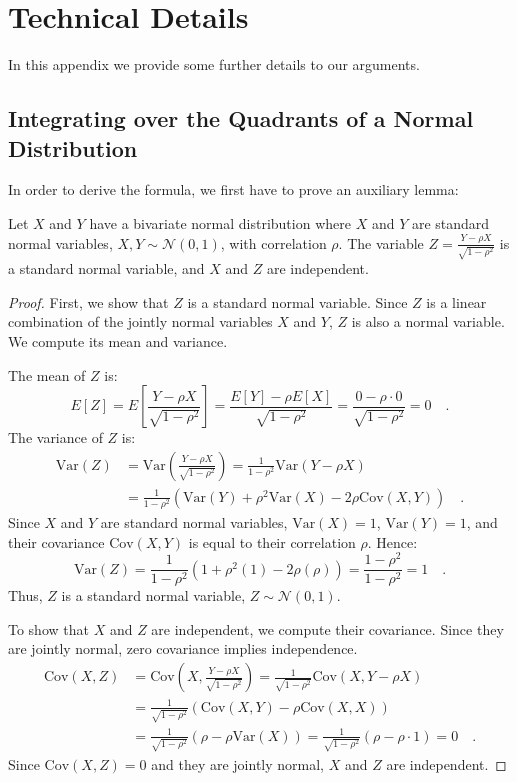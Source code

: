 \documentclass[../../main.tex]{subfiles}
\begin{document}
\chapter{Technical Details}
\label{section:technical_details}
In this appendix we provide some further details to our arguments.

\section{Integrating over the Quadrants of a Normal Distribution}
\label{section:integrating_quadrants}
In order to derive the formula, we first have to prove an auxiliary lemma:

\begin{lemma}
Let $X$ and $Y$ have a bivariate normal distribution where $X$ and $Y$ are standard normal variables, $X, Y \sim \mathcal{N}(0,1)$, with correlation $\rho$. The variable $Z = \frac{Y-\rho X}{\sqrt{1-\rho^2}}$ is a standard normal variable, and $X$ and $Z$ are independent.
\end{lemma}

\begin{proof}
First, we show that $Z$ is a standard normal variable. Since $Z$ is a linear combination of the jointly normal variables $X$ and $Y$, $Z$ is also a normal variable. We compute its mean and variance.

The mean of $Z$ is:
$$ E[Z] = E\left[\frac{Y-\rho X}{\sqrt{1-\rho^2}}\right] = \frac{E[Y]-\rho E[X]}{\sqrt{1-\rho^2}} = \frac{0 - \rho \cdot 0}{\sqrt{1-\rho^2}} = 0 \quad .$$
The variance of $Z$ is:
\begin{align*}
    \text{Var}(Z) &= \text{Var}\left(\frac{Y-\rho X}{\sqrt{1-\rho^2}}\right) = \frac{1}{1-\rho^2}\text{Var}(Y-\rho X) \\
    &= \frac{1}{1-\rho^2}\left(\text{Var}(Y) + \rho^2\text{Var}(X) - 2\rho\text{Cov}(X,Y)\right) \quad .
\end{align*}
Since $X$ and $Y$ are standard normal variables, $\text{Var}(X) = 1$, $\text{Var}(Y) = 1$, and their covariance $\text{Cov}(X,Y)$ is equal to their correlation $\rho$. Hence:
$$ \text{Var}(Z) = \frac{1}{1-\rho^2}(1 + \rho^2(1) - 2\rho(\rho)) = \frac{1-\rho^2}{1-\rho^2} = 1 \quad . $$
Thus, $Z$ is a standard normal variable, $Z \sim \mathcal{N}(0,1)$.

To show that $X$ and $Z$ are independent, we compute their covariance. Since they are jointly normal, zero covariance implies independence.
\begin{align*}
    \text{Cov}(X,Z) &= \text{Cov}\left(X, \frac{Y-\rho X}{\sqrt{1-\rho^2}}\right) = \frac{1}{\sqrt{1-\rho^2}}\text{Cov}(X, Y-\rho X) \\
    &= \frac{1}{\sqrt{1-\rho^2}}\left(\text{Cov}(X,Y) - \rho\text{Cov}(X,X)\right) \\
    &= \frac{1}{\sqrt{1-\rho^2}}\left(\rho - \rho\text{Var}(X)\right) = \frac{1}{\sqrt{1-\rho^2}}(\rho - \rho \cdot 1) = 0 \quad .
\end{align*}
Since $\text{Cov}(X,Z)=0$ and they are jointly normal, $X$ and $Z$ are independent.
\end{proof}
\end{document}
